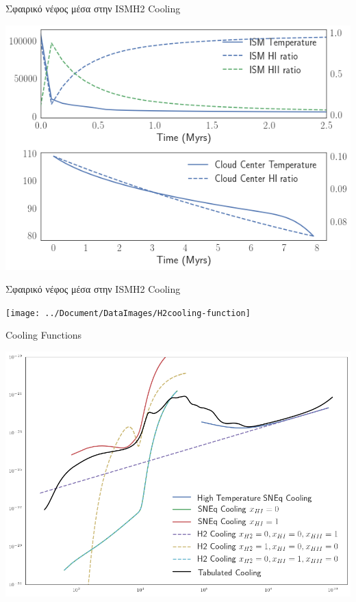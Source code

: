 \documentclass{beamer}
\begin{document}
\begin{frame}{Σφαιρικό νέφος μέσα στην ISM}{Η2 Cooling}
\begin{center}
	\includegraphics[width=0.8\linewidth]{../Document/DataImages/H2CoolingTMPcenterISM}
\end{center}
\end{frame}

\begin{frame}{Σφαιρικό νέφος μέσα στην ISM}{Η2 Cooling}
\begin{center}
	\texttt{[image: ../Document/DataImages/Η2cooling-function]}
\end{center}
\end{frame}

\begin{frame}{Cooling Functions}
\begin{center}
	\includegraphics[width=0.8\linewidth]{../Document/DataImages/cooling-function}
\end{center}
\end{frame}
\end{document}
